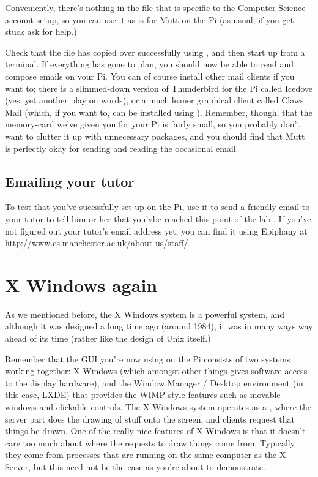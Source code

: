 Conveniently, there's nothing in the  file that is specific to the Computer Science account setup, so you can use it as-is for Mutt on the Pi (as usual, if you get stuck ask for help.)

Check that the file has copied over successfully using , and then start up  from a terminal. If everything has gone to plan, you should now be able to read and compose emails on your Pi. You can of course install other mail clients if you want to; there is a slimmed-down version of Thunderbird for the Pi called Icedove (yes, yet another play on words), or a much leaner graphical client called Claws Mail (which, if you want to, can be installed using ). Remember, though, that the memory-card we've given you for your Pi is fairly small, so you probably don't want to clutter it up with unnecessary packages, and you should find that Mutt is perfectly okay for sending and reading the occasional email.

\subsection{Emailing your tutor}

To test that you've sucessfully set  up on the Pi, use it to send a friendly email to your tutor to tell him or her that you'vbe reached this point of the lab . If you've not figured out your tutor's email address yet, you can find it using Epiphany at \\
\url{http://www.cs.manchester.ac.uk/about-us/staff/}

\section{X Windows again}

As we mentioned before, the X Windows system is a powerful system, and although it was designed a long time ago (around 1984), it was in many ways way ahead of its time (rather like the design of Unix itself.)

Remember that the GUI you're now using on the Pi consists of two systems working together: X Windows (which amongst other things gives software access to the display hardware), and the Window Manager / Desktop environment (in this case, LXDE) that provides the WIMP-style features such as movable windows and clickable controls. The X Windows system operates as a , where the server part does the drawing of stuff onto the screen, and clients request that things be drawn. One of the really nice features of X Windows is that it doesn't care too much about where the requests to draw things come from. Typically they come from processes that are running on the same computer as the X Server, but this need not be the case as you're about to demonstrate.

